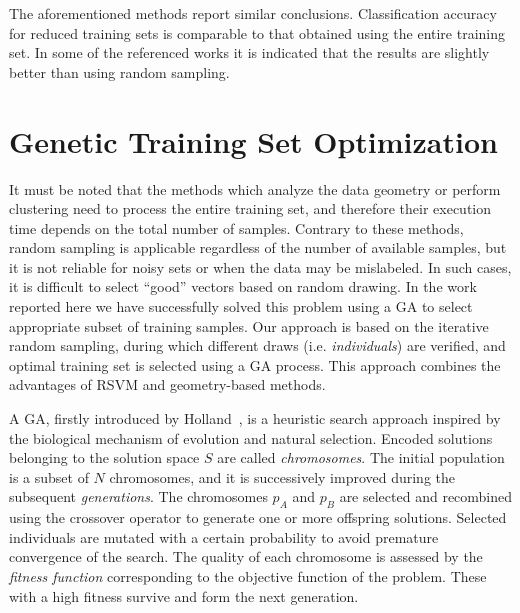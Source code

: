 \documentclass{llncs}
\begin{document}
The aforementioned methods %
report similar conclusions. Classification accuracy for reduced training sets is comparable to that obtained using the entire training set. In some of the referenced works it is indicated that the results are slightly better than using random sampling.

\section{Genetic Training Set Optimization} \label{sec:gasvm}

It must be noted that the methods which analyze the data geometry or
perform clustering need to process the entire training set, and
therefore their execution time depends on the total number of
samples. Contrary to these methods, random sampling is applicable
regardless of the number of available samples, but it is not
reliable for noisy sets or when the data may be mislabeled. In such
cases, it is difficult to select ``good'' vectors based on random
drawing.
In the work reported here we have successfully solved this problem
using a GA to select appropriate subset of training
samples. Our approach is based on the iterative random sampling,
during which different draws (i.e. \emph{individuals}) are verified,
and optimal training set is selected using a GA process. %
This approach combines the advantages of RSVM and
geometry-based methods.

A GA, firstly introduced by Holland~\cite{Holland1975}, is a heuristic
search approach inspired by the biological mechanism of evolution
and natural selection. Encoded solutions belonging to the solution
space $S$ are called \emph{chromosomes}. The initial population is a subset
of $N$ chromosomes, and it is successively improved during
the subsequent \emph{generations}. The chromosomes $p_{A}$ and $p_{B}$ are
selected and recombined using the crossover operator to generate one
or more offspring solutions. Selected individuals are mutated with a
certain probability to avoid premature convergence of the search.
The quality of each chromosome is assessed by the \emph{fitness
function} corresponding to the objective function of the problem.
These with a high fitness survive and form the next generation. %
\end{document}
